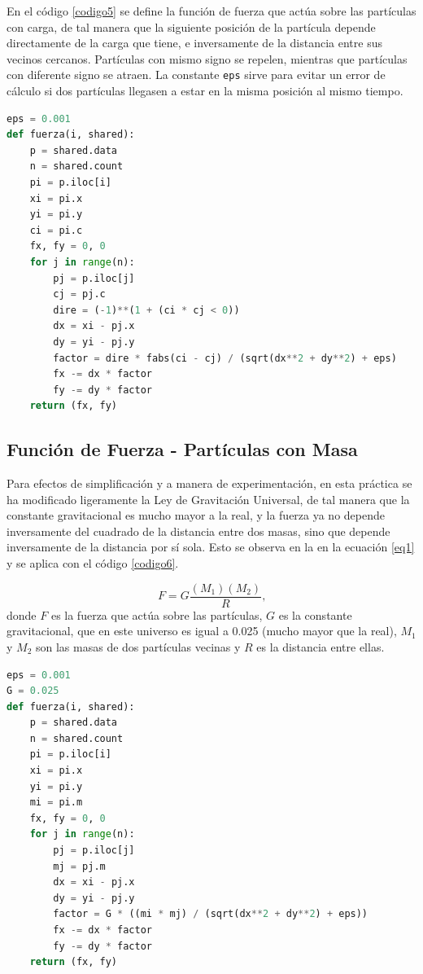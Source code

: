 \documentclass{report}
\begin{document}
En el c\'odigo \ref{codigo5} se define la funci\'on de fuerza que act\'ua sobre las part\'iculas con carga, de tal manera que la siguiente posici\'on de la part\'icula depende directamente de la carga que tiene, e inversamente de la distancia entre sus vecinos cercanos. Part\'iculas con mismo signo se repelen, mientras que part\'iculas con diferente signo se atraen. La constante \texttt{eps} sirve para evitar un error de c\'alculo si dos part\'iculas llegasen a estar en la misma posici\'on al mismo tiempo.

\begin{lstlisting}[caption= Fuerza Aplicada a Part\'iculas con Carga, label=codigo5, language=Python]
eps = 0.001
def fuerza(i, shared):
    p = shared.data
    n = shared.count
    pi = p.iloc[i]
    xi = pi.x
    yi = pi.y
    ci = pi.c
    fx, fy = 0, 0
    for j in range(n):
        pj = p.iloc[j]
        cj = pj.c
        dire = (-1)**(1 + (ci * cj < 0))
        dx = xi - pj.x
        dy = yi - pj.y
        factor = dire * fabs(ci - cj) / (sqrt(dx**2 + dy**2) + eps)
        fx -= dx * factor
        fy -= dy * factor
    return (fx, fy)
\end{lstlisting}

\subsection{Funci\'on de Fuerza - Part\'iculas con Masa}

Para efectos de simplificaci\'on y a manera de experimentaci\'on, en esta pr\'actica se ha modificado ligeramente la Ley de Gravitaci\'on Universal, de tal manera que la constante gravitacional es mucho mayor a la real, y la fuerza ya no depende inversamente del cuadrado de la distancia entre dos masas, sino que depende inversamente de la distancia por s\'i sola. Esto se observa en la en la ecuaci\'on \ref{eq1} y se aplica con el c\'odigo \ref{codigo6}.

\begin{equation}\label{eq1}
    F = G\frac{(M_1)(M_2)}{R}\text{,}
\end{equation}
donde $F$ es la fuerza que act\'ua sobre las part\'iculas, $G$ es la constante gravitacional, que en este universo es igual a 0.025 (mucho mayor que la real), $M_1$ y $M_2$ son las masas de dos part\'iculas vecinas y $R$ es la distancia entre ellas.

\begin{lstlisting}[caption= Fuerza Aplicada a Part\'iculas con Masa, label=codigo6, language=Python]
eps = 0.001
G = 0.025
def fuerza(i, shared):
    p = shared.data
    n = shared.count
    pi = p.iloc[i]
    xi = pi.x
    yi = pi.y
    mi = pi.m
    fx, fy = 0, 0
    for j in range(n):
        pj = p.iloc[j]
        mj = pj.m
        dx = xi - pj.x
        dy = yi - pj.y
        factor = G * ((mi * mj) / (sqrt(dx**2 + dy**2) + eps))
        fx -= dx * factor
        fy -= dy * factor
    return (fx, fy)
\end{lstlisting}
\end{document}
